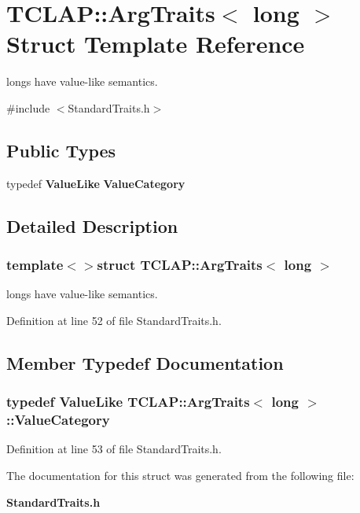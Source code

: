 \section{T\+C\+L\+A\+P\+:\+:Arg\+Traits$<$ long $>$ Struct Template Reference}
\label{structTCLAP_1_1ArgTraits_3_01long_01_4}


longs have value-\/like semantics.  




{\ttfamily \#include $<$Standard\+Traits.\+h$>$}

\subsection*{Public Types}
\begin{DoxyCompactItemize}
\item 
typedef {\bf Value\+Like} {\bf Value\+Category}
\end{DoxyCompactItemize}


\subsection{Detailed Description}
\subsubsection*{template$<$$>$struct T\+C\+L\+A\+P\+::\+Arg\+Traits$<$ long $>$}

longs have value-\/like semantics. 

Definition at line 52 of file Standard\+Traits.\+h.



\subsection{Member Typedef Documentation}
\subsubsection[{Value\+Category}]{\setlength{\rightskip}{0pt plus 5cm}typedef {\bf Value\+Like} {\bf T\+C\+L\+A\+P\+::\+Arg\+Traits}$<$ long $>$\+::{\bf Value\+Category}}\label{structTCLAP_1_1ArgTraits_3_01long_01_4_a942d9a1e813bc3f82b51a2dcedb7316d}


Definition at line 53 of file Standard\+Traits.\+h.



The documentation for this struct was generated from the following file\+:\begin{DoxyCompactItemize}
\item 
{\bf Standard\+Traits.\+h}\end{DoxyCompactItemize}
